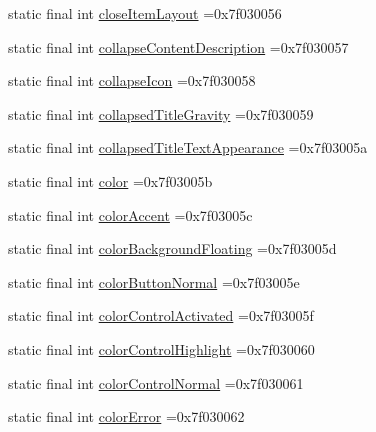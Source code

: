 \begin{DoxyCompactItemize}
\item 
static final int \mbox{\hyperlink{classbr_1_1unb_1_1cic_1_1mp_1_1marketmaster_1_1R_1_1attr_adc755c9a394c6704495acbd446eaa737}{close\+Item\+Layout}} =0x7f030056
\item 
static final int \mbox{\hyperlink{classbr_1_1unb_1_1cic_1_1mp_1_1marketmaster_1_1R_1_1attr_a246acda4e3b58db61be56af9c6a25a26}{collapse\+Content\+Description}} =0x7f030057
\item 
static final int \mbox{\hyperlink{classbr_1_1unb_1_1cic_1_1mp_1_1marketmaster_1_1R_1_1attr_a315758b306c57cce5490833c7ea85df9}{collapse\+Icon}} =0x7f030058
\item 
static final int \mbox{\hyperlink{classbr_1_1unb_1_1cic_1_1mp_1_1marketmaster_1_1R_1_1attr_a865f28b4e186fd7704af0fc878a10733}{collapsed\+Title\+Gravity}} =0x7f030059
\item 
static final int \mbox{\hyperlink{classbr_1_1unb_1_1cic_1_1mp_1_1marketmaster_1_1R_1_1attr_ab2f52a926509d487b7aa232142ec017c}{collapsed\+Title\+Text\+Appearance}} =0x7f03005a
\item 
static final int \mbox{\hyperlink{classbr_1_1unb_1_1cic_1_1mp_1_1marketmaster_1_1R_1_1attr_a55b7da6fc353b6eae7cc4a4f04f7dfe2}{color}} =0x7f03005b
\item 
static final int \mbox{\hyperlink{classbr_1_1unb_1_1cic_1_1mp_1_1marketmaster_1_1R_1_1attr_a627dab7cff5851a3edf839866a455f90}{color\+Accent}} =0x7f03005c
\item 
static final int \mbox{\hyperlink{classbr_1_1unb_1_1cic_1_1mp_1_1marketmaster_1_1R_1_1attr_a724af5b62e71686925e62df2d0fd7215}{color\+Background\+Floating}} =0x7f03005d
\item 
static final int \mbox{\hyperlink{classbr_1_1unb_1_1cic_1_1mp_1_1marketmaster_1_1R_1_1attr_aa215f01627796770eec6114b29ae21f3}{color\+Button\+Normal}} =0x7f03005e
\item 
static final int \mbox{\hyperlink{classbr_1_1unb_1_1cic_1_1mp_1_1marketmaster_1_1R_1_1attr_ab73f9e53ac1b2a329ba62fef98d8d9b9}{color\+Control\+Activated}} =0x7f03005f
\item 
static final int \mbox{\hyperlink{classbr_1_1unb_1_1cic_1_1mp_1_1marketmaster_1_1R_1_1attr_a9642bf15f8955e721f0d13024edd344a}{color\+Control\+Highlight}} =0x7f030060
\item 
static final int \mbox{\hyperlink{classbr_1_1unb_1_1cic_1_1mp_1_1marketmaster_1_1R_1_1attr_ab0b86c06cf78b8730a261de04fa19657}{color\+Control\+Normal}} =0x7f030061
\item 
static final int \mbox{\hyperlink{classbr_1_1unb_1_1cic_1_1mp_1_1marketmaster_1_1R_1_1attr_a7b71575ba5396adbe5503e3b6c763765}{color\+Error}} =0x7f030062

\end{DoxyCompactItemize}
